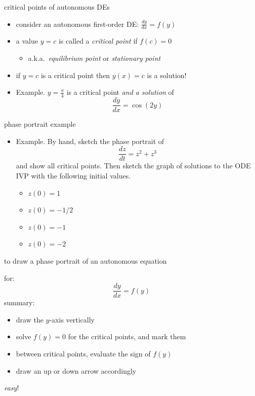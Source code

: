 \documentclass[colorlinks]{beamer}
\begin{document}
\begin{frame}{critical points of autonomous DEs}

\begin{itemize}
\item consider an autonomous first-order DE: \quad $\frac{dy}{dx} = f(y)$
\item a value $y=c$ is called a \emph{critical point} if $f(c)=0$
    \begin{itemize}
    \item a.k.a.~\emph{equilibrium point} or \emph{stationary point}
    \end{itemize}

\medskip
\item if $y=c$ is a critical point then $y(x)=c$ is a solution!

\medskip
\item Example.  $y=\frac{\pi}{4}$ is a critical point \emph{and a solution} of
    $$\frac{dy}{dx} = \cos(2y)$$

\vspace{5mm}
\end{itemize}
\end{frame}


\begin{frame}{phase portrait example}

\begin{itemize}
\small
\item \begin{minipage}[t]{0.4\textwidth}
Example.  By hand, sketch the phase portrait of
   $$\frac{dz}{dt} = z^2 + z^3$$
and show all critical points.  Then sketch the graph of solutions to the ODE IVP with the following initial values.
    \begin{itemize}
    \item[\color{black} \textbf{(a)}] $z(0)=1$
    \item[\color{black} \textbf{(b)}] $z(0)=-1/2$
    \item[\color{black} \textbf{(c)}] $z(0)=-1$
    \item[\color{black} \textbf{(c)}] $z(0)=-2$
    \end{itemize}
\end{minipage}
\end{itemize}
\end{frame}


\begin{frame}{to draw a phase portrait of an autonomous equation}

for:
    $$\frac{dy}{dx}=f(y)$$
summary:
\begin{itemize}
    \item draw the $y$-axis vertically
    \item solve $f(y)=0$ for the critical points, and mark them
    \item between critical points, evaluate the sign of $f(y)$
    \item draw an up or down arrow accordingly
\end{itemize}

\bigskip
\emph{easy}!
\end{frame}
\end{document}
